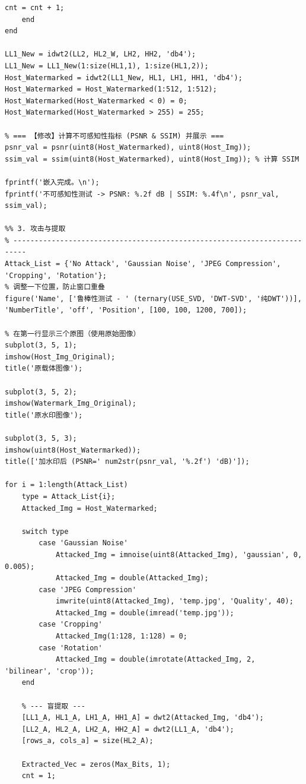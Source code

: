 \documentclass[zihao=-4, a4paper]{ctexart} %
\begin{document}
\begin{lstlisting}[caption={DWT-SVD 水印嵌入与提取完整代码}]
        cnt = cnt + 1;
    end
end

LL1_New = idwt2(LL2, HL2_W, LH2, HH2, 'db4');
LL1_New = LL1_New(1:size(HL1,1), 1:size(HL1,2)); 
Host_Watermarked = idwt2(LL1_New, HL1, LH1, HH1, 'db4');
Host_Watermarked = Host_Watermarked(1:512, 1:512);
Host_Watermarked(Host_Watermarked < 0) = 0;
Host_Watermarked(Host_Watermarked > 255) = 255;

% === 【修改】计算不可感知性指标 (PSNR & SSIM) 并展示 ===
psnr_val = psnr(uint8(Host_Watermarked), uint8(Host_Img));
ssim_val = ssim(uint8(Host_Watermarked), uint8(Host_Img)); % 计算 SSIM

fprintf('嵌入完成。\n');
fprintf('不可感知性测试 -> PSNR: %.2f dB | SSIM: %.4f\n', psnr_val, ssim_val);

%% 3. 攻击与提取
% -------------------------------------------------------------------------
Attack_List = {'No Attack', 'Gaussian Noise', 'JPEG Compression', 'Cropping', 'Rotation'};
% 调整一下位置，防止窗口重叠
figure('Name', ['鲁棒性测试 - ' (ternary(USE_SVD, 'DWT-SVD', '纯DWT'))], 'NumberTitle', 'off', 'Position', [100, 100, 1200, 700]);

% 在第一行显示三个原图（使用原始图像）
subplot(3, 5, 1); 
imshow(Host_Img_Original); 
title('原载体图像');

subplot(3, 5, 2); 
imshow(Watermark_Img_Original); 
title('原水印图像');

subplot(3, 5, 3); 
imshow(uint8(Host_Watermarked)); 
title(['加水印后 (PSNR=' num2str(psnr_val, '%.2f') 'dB)']);

for i = 1:length(Attack_List)
    type = Attack_List{i};
    Attacked_Img = Host_Watermarked;
    
    switch type
        case 'Gaussian Noise'
            Attacked_Img = imnoise(uint8(Attacked_Img), 'gaussian', 0, 0.005);
            Attacked_Img = double(Attacked_Img);
        case 'JPEG Compression'
            imwrite(uint8(Attacked_Img), 'temp.jpg', 'Quality', 40); 
            Attacked_Img = double(imread('temp.jpg'));
        case 'Cropping'
            Attacked_Img(1:128, 1:128) = 0; 
        case 'Rotation'
            Attacked_Img = double(imrotate(Attacked_Img, 2, 'bilinear', 'crop'));
    end
    
    % --- 盲提取 ---
    [LL1_A, HL1_A, LH1_A, HH1_A] = dwt2(Attacked_Img, 'db4');
    [LL2_A, HL2_A, LH2_A, HH2_A] = dwt2(LL1_A, 'db4');
    [rows_a, cols_a] = size(HL2_A);
    
    Extracted_Vec = zeros(Max_Bits, 1);
    cnt = 1;
    

\end{lstlisting}
\end{document}
